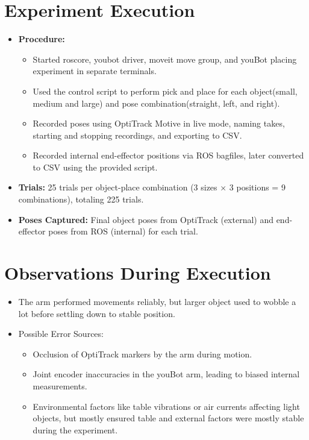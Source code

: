 \section{Experiment Execution}
\begin{itemize}
    \item \textbf{Procedure:} 
    \begin{itemize}
        \item Started roscore, youbot driver, moveit move group, and youBot placing experiment in separate terminals.
        \item Used the control script to perform pick and place for each object(small, medium and large) and pose combination(straight, left, and right).
        \item Recorded poses using OptiTrack Motive in live mode, naming takes, starting and stopping recordings, and exporting to CSV.
        \item Recorded internal end-effector positions via ROS bagfiles, later converted to CSV using the provided script.
    \end{itemize}
    \item \textbf{Trials:} 25 trials per object-place combination (3 sizes × 3 positions = 9 combinations), totaling 225 trials.
    \item \textbf{Poses Captured:} Final object poses from OptiTrack (external) and end-effector poses from ROS (internal) for each trial.
\end{itemize}



\section{Observations During Execution}
\begin{itemize}
    \item The arm performed movements reliably, but larger object used to wobble a lot before settling down to stable position.
    \item Possible Error Sources:
    \begin{itemize}
        \item Occlusion of OptiTrack markers by the arm during motion.
        \item Joint encoder inaccuracies in the youBot arm, leading to biased internal measurements.
        \item Environmental factors like table vibrations or air currents affecting light objects, but mostly ensured table and external factors were mostly stable during the experiment.
    \end{itemize}
\end{itemize}




